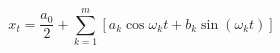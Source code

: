 \documentclass{article}
\begin{document}
\begin{equation*}

x_t = \frac{a_0}{2} + \sum_{k=1}^m [a_k \cos \omega_k t + b_k \sin
  (\omega_k t) ]

\end{equation*}
\end{document}
